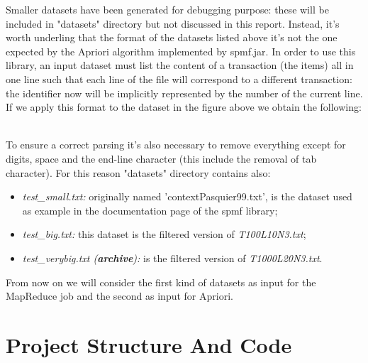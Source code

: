 \documentclass[]{report}
\begin{document}
	Smaller datasets have been generated for debugging purpose: these will be included in "datasets" directory but not discussed in this report. 
	Instead, it's worth underling that the format of the datasets listed above it's not the one expected by the Apriori algorithm implemented by spmf.jar.
	In order to use this library, an input dataset must list the content of a transaction (the items) all in one line such that each line of the file will correspond to a different transaction: the identifier now will be implicitly represented by the number of the current line. If we apply this format to the dataset in the figure above we obtain the following: \vspace{-0.4cm}\\
	\begin{figure}[h]
		\centering
	\end{figure}
	\vspace{-0.5cm}\\
	To ensure a correct parsing it's also necessary to remove everything except for digits, space and the end-line character (this include the removal of tab character). For this reason "datasets" directory contains also:    
	\begin{itemize}	 
		\item \textit{test\_small.txt:} originally named 'contextPasquier99.txt', is the dataset used as example in the documentation page of the spmf library;
		\item \textit{test\_big.txt:} this dataset is the filtered version of \textit{T100L10N3.txt}; 
		\item \textit{test\_verybig.txt (\textbf{archive}):} is the filtered version of \textit{T1000L20N3.txt}.
	\end{itemize}
	From now on we will consider the first kind of datasets as input for the MapReduce job and the second as input for Apriori.

\chapter*{\huge Project Structure And Code}   		
\end{document}
